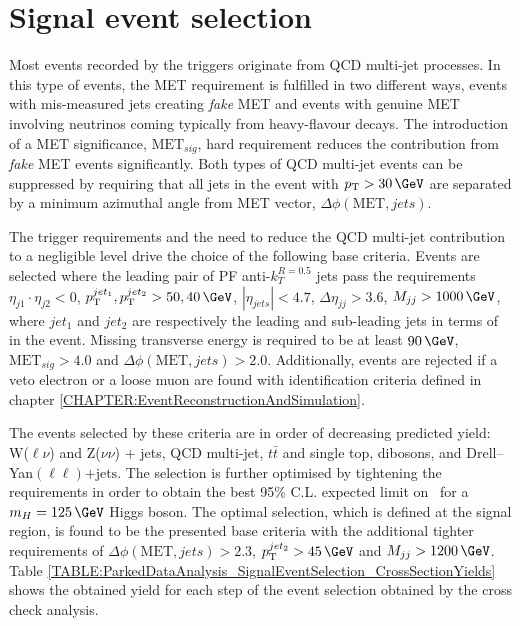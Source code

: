 \section{Signal event selection}
\label{SECTION:ParkedDataAnalysis_SignalEventSelection}


Most events recorded by the triggers originate from \gls{QCD} multi-jet processes. In this type of events, the \gls{MET} requirement is fulfilled in two different ways, events with mis-measured jets creating \textit{fake} \gls{MET} and events with genuine \gls{MET} involving neutrinos coming typically from heavy-flavour decays. The introduction of a \gls{MET} significance, $\text{MET}_{sig}$, hard requirement reduces the contribution from \textit{fake} \gls{MET} events significantly. Both types of \gls{QCD} multi-jet events can be suppressed by requiring that all jets in the event with $\pt>30\,\GeV$ are separated by a minimum azimuthal angle from \gls{MET} vector, $\Delta\phi(\text{MET},jets)$.

The trigger requirements and the need to reduce the \gls{QCD} multi-jet contribution to a negligible level drive the choice of the following base criteria. Events are selected where the leading pair of \gls{PF} anti-$k_T^{R=0.5}$ jets pass the requirements $\eta_{j1} \cdot \eta_{j2}<0$, $\pt^{jet_1},\pt^{jet_2} > 50,40\,\GeV$, $|\eta_{jets}| < 4.7$, $\Delta\eta_{jj}>3.6$, $M_{jj}>1000\,\GeV$,  where $jet_1$ and $jet_2$ are respectively the leading and sub-leading jets in terms of \pt in the event. Missing transverse energy is required to be at least $90\,\GeV$, $\text{MET}_{sig}>4.0$ and $\Delta\phi(\text{MET},jets)>2.0$. Additionally, events are rejected if a veto electron or a loose muon are found with identification criteria defined in chapter \ref{CHAPTER:EventReconstructionAndSimulation}.

The events selected by these criteria are in order of decreasing predicted yield: W($\ell\nu$) and Z($\nu\nu$) + jets, \gls{QCD} multi-jet, $t\bar{t}$ and single top, dibosons, and Drell--Yan$(\ell\ell)\text{+jets}$. The selection is further optimised by tightening the requirements in order to obtain the best 95\% C.L. expected limit on \BRinv\, for a $m_H=125\,\GeV$ Higgs boson. The optimal selection, which is defined at the signal region, is found to be the presented base criteria with the additional tighter requirements of $\Delta\phi(\text{MET},jets)>2.3$, $\pt^{jet_2}>45\,\GeV$ and $M_{jj}>1200\,\GeV$. Table \ref{TABLE:ParkedDataAnalysis_SignalEventSelection_CrossSectionYields} shows the obtained yield for each step of the event selection obtained by the cross check analysis.

